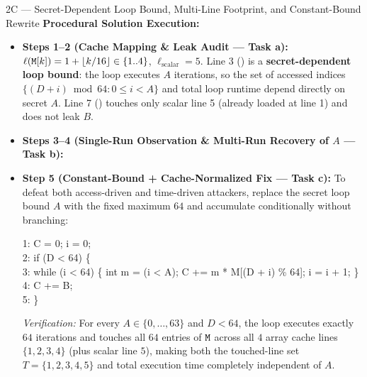 \begin{templatebox}{2C --- Secret-Dependent Loop Bound, Multi-Line Footprint, and Constant-Bound Rewrite}
\medskip
\textbf{Procedural Solution Execution:}
\begin{itemize}
  \item \textbf{Steps 1--2 (Cache Mapping \& Leak Audit --- Task a):}
  $\ell(\texttt{M}[k]) = 1 + \lfloor k/16 \rfloor \in \{1..4\}$, $\ell_{\text{scalar}} = 5$. Line 3 () is a \textbf{secret-dependent loop bound}: the loop executes $A$ iterations, so the set of accessed indices $\{(D + i) \bmod 64 : 0 \le i < A\}$ and total loop runtime depend directly on secret $A$. Line 7 () touches only scalar line 5 (already loaded at line 1) and does not leak $B$.
  \item \textbf{Steps 3--4 (Single-Run Observation \& Multi-Run Recovery of $A$ --- Task b):}
  \item \textbf{Step 5 (Constant-Bound + Cache-Normalized Fix --- Task c):}
  To defeat both access-driven and time-driven attackers, replace the secret loop bound $A$ with the fixed maximum $64$ and accumulate conditionally without branching:
  \begin{codeblock}
1: C = 0; \; i = 0;\\
2: if (D < 64) \{\\
3: \hspace*{1.5em} while (i < 64) \{ int m = (i < A); \; C += m * M[(D + i) \% 64]; \; i = i + 1; \}\\
4: \hspace*{1.5em} C += B;\\
5: \}
  \end{codeblock}
  \emph{Verification:} For every $A \in \{0,\dots,63\}$ and $D < 64$, the loop executes exactly $64$ iterations and touches all $64$ entries of $\texttt{M}$ across all $4$ array cache lines $\{1,2,3,4\}$ (plus scalar line $5$), making both the touched-line set $T = \{1,2,3,4,5\}$ and total execution time completely independent of $A$.
\end{itemize}
\end{templatebox}


